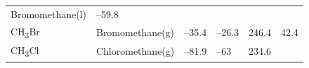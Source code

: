 \documentclass[
]{book}
\theoremstyle{definition}
\theoremstyle{definition}
\theoremstyle{definition}
\theoremstyle{remark}
\begin{document}
\begin{longtable}[]{@{}llllll@{}}
\begin{minipage}[t]{0.17\columnwidth}
Bromomethane(l)\strut
\end{minipage} & \begin{minipage}[t]{0.15\columnwidth}\raggedright
--59.8\strut
\end{minipage} & \begin{minipage}[t]{0.15\columnwidth}\raggedright
\strut
\end{minipage} & \begin{minipage}[t]{0.14\columnwidth}\raggedright
\strut
\end{minipage} & \begin{minipage}[t]{0.14\columnwidth}\raggedright
\strut
\end{minipage}\tabularnewline
\begin{minipage}[t]{0.07\columnwidth}\raggedright
CH\textsubscript{3}Br\strut
\end{minipage} & \begin{minipage}[t]{0.17\columnwidth}\raggedright
Bromomethane(g)\strut
\end{minipage} & \begin{minipage}[t]{0.15\columnwidth}\raggedright
--35.4\strut
\end{minipage} & \begin{minipage}[t]{0.15\columnwidth}\raggedright
--26.3\strut
\end{minipage} & \begin{minipage}[t]{0.14\columnwidth}\raggedright
246.4\strut
\end{minipage} & \begin{minipage}[t]{0.14\columnwidth}\raggedright
42.4\strut
\end{minipage}\tabularnewline
\begin{minipage}[t]{0.07\columnwidth}\raggedright
CH\textsubscript{3}Cl\strut
\end{minipage} & \begin{minipage}[t]{0.17\columnwidth}\raggedright
Chloromethane(g)\strut
\end{minipage} & \begin{minipage}[t]{0.15\columnwidth}\raggedright
--81.9\strut
\end{minipage} & \begin{minipage}[t]{0.15\columnwidth}\raggedright
--63\strut
\end{minipage} & \begin{minipage}[t]{0.14\columnwidth}\raggedright
234.6\strut
\end{minipage} & \begin{minipage}[t]{0.14\columnwidth}\raggedright

\end{minipage}
\end{longtable}
\end{document}
